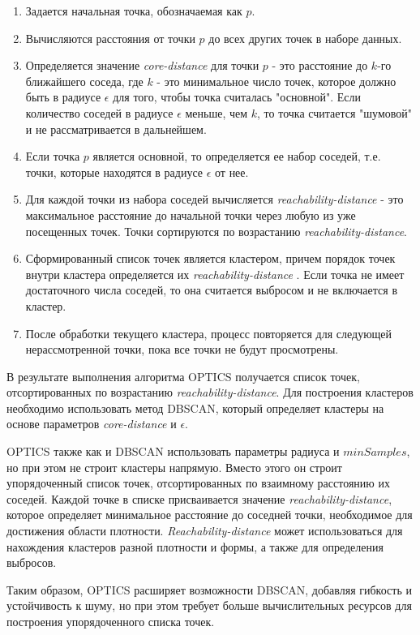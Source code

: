 \documentclass{article}
\begin{document}
\begin{enumerate}
\item Задается начальная точка, обозначаемая как $p$.
\item Вычисляются расстояния от точки $p$ до всех других точек в наборе данных.
\item Определяется значение {\it core-distance} для точки $p$ - это расстояние до $k$-го ближайшего соседа, где $k$ - это минимальное число точек, которое должно быть в радиусе $\epsilon$ для того, чтобы точка считалась "основной". Если количество соседей в радиусе $\epsilon$ меньше, чем $k$, то точка считается "шумовой" и не рассматривается в дальнейшем.
\item Если точка $p$ является основной, то определяется ее набор соседей, т.е. точки, которые находятся в радиусе $\epsilon$ от нее.
\item Для каждой точки из набора соседей вычисляется {\it reachability-distance} - это максимальное расстояние до начальной точки через любую из уже посещенных точек.
Точки сортируются по возрастанию {\it reachability-distance}.
\item Сформированный список точек является кластером, причем порядок точек внутри кластера определяется их {\it reachability-distance} . Если точка не имеет достаточного числа соседей, то она считается выбросом и не включается в кластер.
\item После обработки текущего кластера, процесс повторяется для следующей нерассмотренной точки, пока все точки не будут просмотрены.

\end{enumerate}

В результате выполнения алгоритма OPTICS получается список точек, отсортированных по возрастанию {\it reachability-distance}. Для построения кластеров необходимо использовать метод DBSCAN, который определяет кластеры на основе параметров {\it core-distance} и $\epsilon$.

OPTICS также как и DBSCAN использовать параметры радиуса и $minSamples$, но при этом не строит кластеры напрямую. Вместо этого он строит упорядоченный список точек, отсортированных по взаимному расстоянию их соседей. Каждой точке в списке присваивается значение {\it reachability-distance}, которое определяет минимальное расстояние до соседней точки, необходимое для достижения области плотности. {\it Reachability-distance} может использоваться для нахождения кластеров разной плотности и формы, а также для определения выбросов.

Таким образом, OPTICS расширяет возможности DBSCAN, добавляя гибкость и устойчивость к шуму, но при этом требует больше вычислительных ресурсов для построения упорядоченного списка точек.
\end{document}
